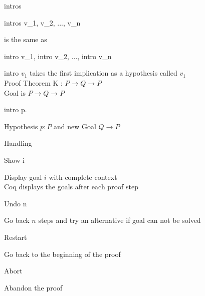 \begin{frame}[fragile]{intros}
	\begin{user}
	intros v_1, v_2, ..., v_n
	\end{user}
	is the same as
	\begin{user}
	intro v_1, intro v_2, ..., intro v_n
	\end{user}
	\pause
	intro $v_1$ takes the first implication as a hypothesis called $v_1$\\
	\bigskip
	\pause
	Proof Theorem K : $P \rightarrow Q \rightarrow P$\\
	\pause
	Goal is  $P \rightarrow Q \rightarrow P$\\
	\pause
	\begin{user}
	intro p.
	\end{user}
	Hypothesis $p:P$ and new Goal $Q \rightarrow P$
\end{frame}
\begin{frame}[fragile]{Handling}
	\begin{user}
		Show i
	\end{user}
	Display goal $i$ with complete context\\
	Coq displays the goals after each proof step
	\pause
	\medskip
	\begin{user}
		Undo n
	\end{user}
	Go back $n$ steps and try an alternative if goal can not be solved
	\pause
	\medskip
	\begin{user}
		Restart
	\end{user}
	Go back to the beginning of the proof
	\pause
	\medskip
	\begin{user}
		Abort
	\end{user}
	Abandon the proof
\end{frame}

